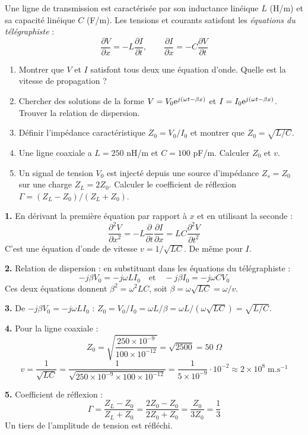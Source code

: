 \documentclass[12pt,a4paper]{article}
\begin{document}
\begin{boiteexercice}
Une ligne de transmission est caractérisée par son inductance linéique $L$ (H/m) et sa capacité linéique $C$ (F/m). Les tensions et courants satisfont les \textit{équations du télégraphiste} :
\[
\frac{\partial V}{\partial x} = -L\frac{\partial I}{\partial t}, \qquad \frac{\partial I}{\partial x} = -C\frac{\partial V}{\partial t}
\]
\begin{enumerate}
  \item Montrer que $V$ et $I$ satisfont tous deux une équation d'onde. Quelle est la vitesse de propagation ?
  \item Chercher des solutions de la forme $V = V_0\mathrm{e}^{j(\omega t - \beta x)}$ et $I = I_0\mathrm{e}^{j(\omega t-\beta x)}$. Trouver la relation de dispersion.
  \item Définir l'impédance caractéristique $Z_0 = V_0/I_0$ et montrer que $Z_0 = \sqrt{L/C}$.
  \item Une ligne coaxiale a $L = 250$ nH/m et $C = 100$ pF/m. Calculer $Z_0$ et $v$.
  \item Un signal de tension $V_0$ est injecté depuis une source d'impédance $Z_s = Z_0$ sur une charge $Z_L = 2Z_0$. Calculer le coefficient de réflexion $\Gamma = (Z_L-Z_0)/(Z_L+Z_0)$.
\end{enumerate}
\end{boiteexercice}

\begin{boitecorrige}
\textbf{1.} En dérivant la première équation par rapport à $x$ et en utilisant la seconde :
\[
\frac{\partial^2 V}{\partial x^2} = -L\frac{\partial}{\partial t}\frac{\partial I}{\partial x} = LC\frac{\partial^2 V}{\partial t^2}
\]
C'est une équation d'onde de vitesse $v = 1/\sqrt{LC}$. De même pour $I$.

\textbf{2.} Relation de dispersion : en substituant dans les équations du télégraphiste :
\[
-j\beta V_0 = -j\omega L I_0 \quad\text{et}\quad -j\beta I_0 = -j\omega C V_0
\]
Ces deux équations donnent $\beta^2 = \omega^2 LC$, soit $\beta = \omega\sqrt{LC} = \omega/v$.

\textbf{3.} De $-j\beta V_0 = -j\omega L I_0$ : $Z_0 = V_0/I_0 = \omega L/\beta = \omega L/(\omega\sqrt{LC}) = \sqrt{L/C}$.

\textbf{4.} Pour la ligne coaxiale :
\[
Z_0 = \sqrt{\frac{250\times10^{-9}}{100\times10^{-12}}} = \sqrt{2500} = 50\;\Omega
\]
\[
v = \frac{1}{\sqrt{LC}} = \frac{1}{\sqrt{250\times10^{-9}\times100\times10^{-12}}} = \frac{1}{5\times10^{-9}}\cdot10^{-2}\approx 2\times10^8\;\text{m.s}^{-1}
\]

\textbf{5.} Coefficient de réflexion :
\[
\Gamma = \frac{Z_L - Z_0}{Z_L + Z_0} = \frac{2Z_0 - Z_0}{2Z_0 + Z_0} = \frac{Z_0}{3Z_0} = \frac{1}{3}
\]
Un tiers de l'amplitude de tension est réfléchi.
\end{boitecorrige}
\end{document}
